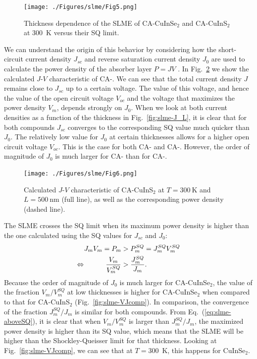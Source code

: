 \begin{refsection}
\begin{figure}[htbp] 
	\centering 
		\texttt{[image: ./Figures/slme/Fig5.png]} 
	\caption{Thickness dependence of the SLME of CA-CuInSe$_2$ and CA-CuInS$_2$ 
at 300~\si{\kelvin} versus their SQ limit.} 
	\label{fig:slme-SLME_L} 
\end{figure} 
 
We can understand the origin of this behavior by considering how the 
short-circuit current density $J_{sc}$ and reverse saturation current density 
$J_0$ are used to calculate the power density of the absorber layer $P = JV$ . 
In Fig.~\ref{fig:slme-CuInS2_JV} we show the calculated \mbox{$J$-$V$} 
characteristic of \mbox{CA-}. We can see that the total current 
density $J$ remains close to $J_{sc}$ up to a certain voltage. The value of 
this voltage, and hence the value of the open circuit voltage $V_{oc}$ and the 
voltage that maximizes the power density $V_{m}$, depends strongly on $J_0$. 
When we look at both current densities as a function of the thickness in 
Fig.~\ref{fig:slme-J_L}, it is clear that for both compounds $J_{sc}$ 
converges to the corresponding SQ value much quicker than $J_0$. The 
relatively low value for $J_0$ at certain thicknesses allows for a higher open 
circuit voltage $V_{oc}$. This is the case for both \mbox{CA-} and 
\mbox{CA-}. However, the order of magnitude of $J_0$ is much 
larger for CA- than for \mbox{CA-}. 
 
\begin{figure}[htbp] 
	\centering 
		\texttt{[image: ./Figures/slme/Fig6.png]} 
	\caption{Calculated $J$-$V$ characteristic of CA-CuInS$_2$ at 
$T=300~\si{\kelvin}$ and $L = 500~\si{\nano\meter}$ (full line), as well as 
the corresponding power density (dashed line).} 
	\label{fig:slme-CuInS2_JV} 
\end{figure} 
 
The SLME crosses the SQ limit when its maximum power density is higher than 
the one calculated using the SQ values for $J_{sc}$ and $J_0$: 
\begin{equation} \label{eq:slme-aboveSQ} 
\begin{aligned} 
J_m V_m = P_m &> P_m^{SQ} = J_m^{SQ} V_m^{SQ} \\ 
\Leftrightarrow \hspace{0.4in}\frac{V_m}{V_m^{SQ}} &> \frac{J_m^{SQ}}{J_m}. 
\end{aligned} 
\end{equation} 
Because the order of magnitude of $J_0$ is much larger for 
\mbox{CA-CuInSe$_2$}, the value of the fraction $V_m/V_m^{SQ}$ at low 
thicknesses is higher for \mbox{CA-CuInSe$_2$} when compared to that for 
\mbox{CA-CuInS$_2$} (Fig.~\ref{fig:slme-VJcomp}). In comparison, the 
convergence of the fraction $J_m^{SQ}/J_m$ is similar for both compounds. From 
Eq.~(\ref{eq:slme-aboveSQ}), it is clear that when $V_m/V_m^{SQ}$ is larger 
than $J_m^{SQ}/J_m$, the maximized power density is higher than its SQ value, 
which means that the SLME will be higher than the Shockley-Queisser limit for 
that thickness. Looking at Fig.~\ref{fig:slme-VJcomp}, we can see that at 
$T=300$~\si{\kelvin}, this happens for CuInSe$_2$. 
 

\end{refsection}
